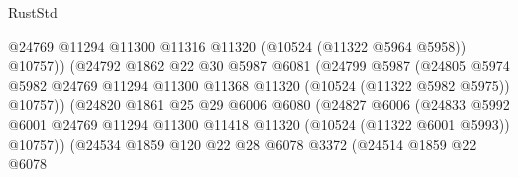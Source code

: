 \begin{lexlean}{RustStd}
\begin{coremodule}
                                        @24769
                                        @11294
                                        @11300
                                        @11316
                                        @11320
                                        (@10524 (@11322 @5964 @5958))
                                        @10757))
                                    (@24792
                                      @1862
                                      @22
                                      @30
                                      @5987
                                      @6081
                                      (@24799
                                        @5987
                                        (@24805
                                          @5974
                                          @5982
                                          @24769
                                          @11294
                                          @11300
                                          @11368
                                          @11320
                                          (@10524 (@11322 @5982 @5975))
                                          @10757))
                                      (@24820
                                        @1861
                                        @25
                                        @29
                                        @6006
                                        @6080
                                        (@24827
                                          @6006
                                          (@24833
                                            @5992
                                            @6001
                                            @24769
                                            @11294
                                            @11300
                                            @11418
                                            @11320
                                            (@10524 (@11322 @6001 @5993))
                                            @10757))
                                        (@24534
                                          @1859
                                          @120
                                          @22
                                          @28
                                          @6078
                                          @3372
                                          (@24514
                                            @1859
                                            @22
                                            @6078

\end{coremodule}
\end{lexlean}
